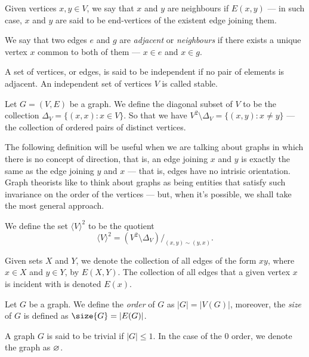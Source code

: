 \begin{definition}[Adjacency]
Given vertices \(x, y \in V\), we say that \(x\) and \(y\) are neighbours if
\(E(x, y)\) --- in such case, \(x\) and \(y\) are said to be end-vertices of the
existent edge joining them.

We say that two edges \(e\) and \(g\) are \emph{adjacent} or \emph{neighbours}
if there exists a unique vertex \(x\) common to both of them --- \(x \in e\)
and \(x \in g\).

A set of vertices, or edges, is said to be independent if no pair of elements
is adjacent. An independent set of vertices \(V\) is called stable.
\end{definition}

\begin{definition}
Let \(G = (V, E)\) be a graph. We define the diagonal subset of \(V\) to be
the collection \(\Delta_V = \{(x, x) \colon x \in V\}\). So that we have
\(V^2 \setminus \Delta_V = \{(x, y) \colon x \neq y\}\) --- the collection of
ordered pairs of distinct vertices.
\end{definition}

The following definition will be useful when we are talking about graphs in
which there is no concept of direction, that is, an edge joining \(x\) and \(y\)
is exactly the same as the edge joining \(y\) and \(x\) --- that is, edges have no
intrisic orientation. Graph theorists like to think about graphs as being
entities that satisfy such invariance on the order of the vertices --- but, when
it's possible, we shall take the most general approach.

\begin{definition}
We define the set \(\langle V \rangle^2\) to be the quotient
\[
  \langle V \rangle^2 = (V^2 \setminus \Delta_V)/_{(x, y) \sim (y, x)}.
\]
\end{definition}

\begin{notation}
Given sets \(X\) and \(Y\), we denote the collection of all edges of the form
\(xy\), where \(x \in X\) and \(y \in Y\), by \(E(X, Y)\). The collection of
all edges that a given vertex \(x\) is incident with is denoted \(E(x)\).
\end{notation}

\begin{definition}\label{def:graph-order-size}
Let \(G\) be a graph. We define the \emph{order} of \(G\) as \(|G| =|V(G)|\),
moreover, the \emph{size} of \(G\) is defined as \(\size{G} = |E(G)|\).
\end{definition}

\begin{definition}
A graph \(G\) is said to be trivial if \(|G| \leq 1\). In the case of the
\(0\) order, we denote the graph as \(\varnothing\).
\end{definition}
